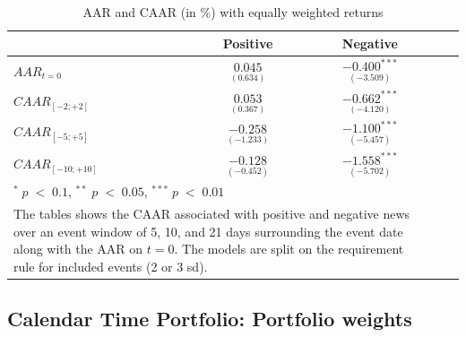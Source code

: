 \begin{table}[ht]
\centering
\caption{AAR and CAAR (in \%) with equally weighted returns} 
\begin{tabular}{lcccc}
  \hline  \hline
  & \multicolumn{1}{c}{Positive} &  \multicolumn{1}{c}{Negative}\\  
 \hline
$AAR_{t=0}$ &  $\underset{(0.634)}{0.045}$ & $\underset{(-3.509)}{-0.400^{***}}$ \\ 
$CAAR_{[-2;+2]}$  & $\underset{(0.367)}{0.053}$ & $\underset{(-4.120)}{-0.662^{***}}$ \\ 
$CAAR_{[-5;+5]}$  & $\underset{(-1.233)}{-0.258}$ & $\underset{(-5.457)}{-1.100^{***}}$ \\ 
$CAAR_{[-10;+10]}$    & $\underset{(-0.452)}{-0.128 }$ & $\underset{(-5.702)}{-1.558^{***}}$ \\ 
   \hline \hline
   \multicolumn{3}{p{10cm}}{ \footnotesize $^* \; p\; <\; 0.1$, $ ^{**} \; p\; <\; 0.05$, $ ^{***} \; p\; <\; 0.01$  } \\
   \multicolumn{3}{p{10cm}}{\footnotesize The tables shows the CAAR associated with positive and negative news over an event window of 5, 10, and 21 days surrounding the event date along with the AAR on $t=0$. The models are split on the requirement rule for included events (2 or 3 sd).} \\
   \hline
\end{tabular}
\label{tab:ST_sensitivity_weights}
\end{table}







\subsection{Calendar Time Portfolio: Portfolio weights}

